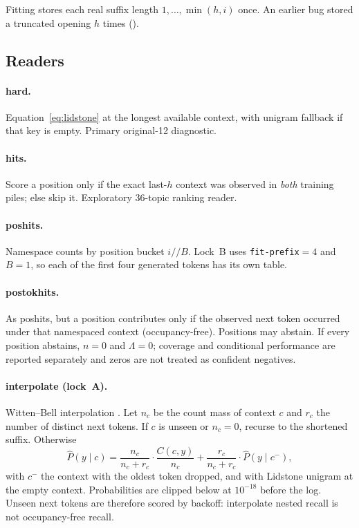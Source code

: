 \documentclass[11pt,a4paper]{article}
\theoremstyle{definition}
\newcommand{\LLR}{\Lambda}
\newcommand{\hist}{h}
\begin{document}
Fitting stores each real suffix length $1,\ldots,\min(\hist,i)$ once.
An earlier bug stored a truncated opening $\hist$ times
().

\subsection{Readers}
\label{sec:readers}

\paragraph{hard.}
Equation~\eqref{eq:lidstone} at the longest available context, with
unigram fallback if that key is empty. Primary original-12 diagnostic.

\paragraph{hits.}
Score a position only if the exact last-$\hist$ context was observed in
\emph{both} training piles; else skip it. Exploratory 36-topic ranking
reader.

\paragraph{poshits.}
Namespace counts by position bucket $i // B$. Lock~B uses
\texttt{fit-prefix}${}=4$ and $B=1$, so each of the first four generated
tokens has its own table.

\paragraph{postokhits.}
As poshits, but a position contributes only if the observed next token
occurred under that namespaced context (occupancy-free). Positions may
abstain. If every position abstains, $n=0$ and $\LLR=0$; coverage and
conditional performance are reported separately and zeros are not
treated as confident negatives.

\paragraph{interpolate (lock~A).}
Witten--Bell interpolation \citep{witten1991zero}. Let $n_c$ be the
count mass of context $c$ and $r_c$ the number of distinct next tokens.
If $c$ is unseen or $n_c=0$, recurse to the shortened suffix. Otherwise
\[
\hat P(y\mid c)
=
\frac{n_c}{n_c+r_c}\cdot \frac{C(c,y)}{n_c}
+
\frac{r_c}{n_c+r_c}\cdot \hat P(y\mid c^{-}),
\]
with $c^{-}$ the context with the oldest token dropped, and with
Lidstone unigram at the empty context. Probabilities are clipped below
at $10^{-18}$ before the log. Unseen next tokens are therefore scored by
backoff: interpolate nested recall is not occupancy-free recall.
\end{document}
